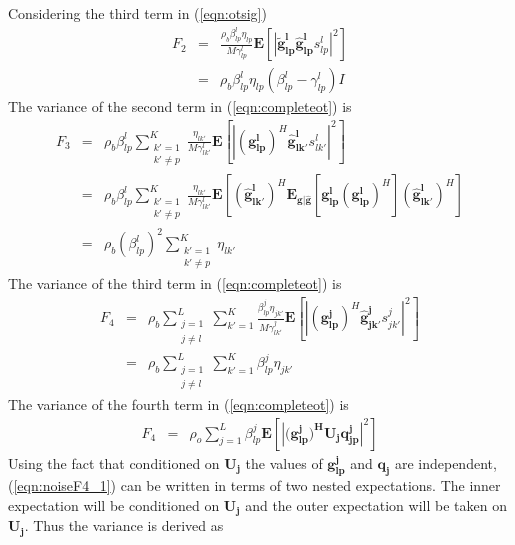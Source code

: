 \documentclass[10pt, a4paper, twoside,fleqn]{article}
\begin{document}
Considering the third term in (\ref{eqn:otsig}) 
\begin{eqnarray}\label{eq:noiseF2}
	F_2 &=& \frac{\rho_b\beta_{lp}^{l}\eta_{lp}}{M\gamma_{lp}^{l}} \mathbf{E}[| \mathbf{\widetilde{g}_{lp}^{l}} \mathbf{\hat g_{lp}^{l}} s_{lp}^{l}|^2] \nonumber \\
	    &=&  \rho_b\beta_{lp}^{l}\eta_{lp} (\beta_{lp}^{l} - \gamma_{lp}^{l})I 
\end{eqnarray}
The variance of the second term in (\ref{eqn:completeot}) is
\begin{eqnarray}\label{eq:noiseF3}
	F_3 &=& \rho_b\beta_{lp}^{l}\sum_{\substack{k'=1 \\ k' \neq p}}^{K}\frac{\eta_{lk'}}{M\gamma_{lk'}^{l}} \mathbf{E}[|(\mathbf{g_{lp}^{l}})^H \mathbf{\hat g_{lk'}^{l}} s_{lk'}^{l}|^2] \nonumber \\
            &=& \rho_b\beta_{lp}^{l}\sum_{\substack{k'=1 \\ k' \neq p}}^{K}\frac{\eta_{lk'}}{M\gamma_{lk'}^{l}} \mathbf{E} \left[(\mathbf{\hat g_{lk'}^{l}})^H \mathbf{E_{g|\hat g}} \left[\mathbf{g_{lp}^{l}} (\mathbf{g_{lp}^{l}})^H \right] (\mathbf{\hat g_{lk'}^{l}})^H \right] \\ 
	    &=&  \rho_b(\beta_{lp}^{l})^2\sum_{\substack{k'=1 \\ k' \neq p}}^{K}\eta_{lk'} 
\end{eqnarray}
The variance of the third term in (\ref{eqn:completeot}) is
\begin{eqnarray}\label{eqn:noiseF4}
	F_4 &=& \rho_b\sum_{\substack{j=1 \\j \neq l}}^{L} \sum_{k'=1}^{K} \frac{\beta_{lp}^{j}\eta_{jk'}}{M\gamma_{lk'}^{j}} \mathbf{E}\left[ |(\mathbf{g_{lp}^{j}})^H \mathbf{\hat g_{jk'}^{j}} s_{jk'}^{j}|^2 \right] \nonumber \\
            &=&  \rho_b\sum_{\substack{j=1 \\j \neq l}}^{L} \sum_{k'=1}^{K} \beta_{lp}^{j}\eta_{jk'}
\end{eqnarray}
The variance of the fourth term in (\ref{eqn:completeot}) is
\begin{eqnarray}\label{eqn:noiseF4_1}
	F_4 &=& \rho_o\sum_{j=1}^{L}\beta_{lp}^{j}\mathbf{E}\left[|(\mathbf{g_{lp}^{j})^HU_jq_{jp}^{j}}|^2\right] \nonumber
\end{eqnarray}
Using the fact that conditioned on $\mathbf{U_j}$ the values of $\mathbf{g_{lp}^{j}}$ and $\mathbf{q_{j}}$ are independent, (\ref{eqn:noiseF4_1}) can be written in terms of two nested expectations. The inner expectation will be conditioned on $\mathbf{U_j}$ and the outer expectation will be taken on  $\mathbf{U_j}$. Thus the variance is derived as
\end{document}

